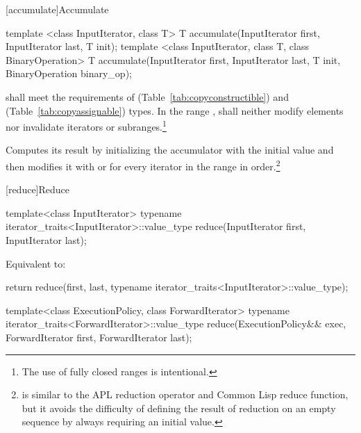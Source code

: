 [accumulate]{Accumulate}

%
\begin{itemdecl}
template <class InputIterator, class T>
  T accumulate(InputIterator first, InputIterator last, T init);
template <class InputIterator, class T, class BinaryOperation>
  T accumulate(InputIterator first, InputIterator last, T init,
               BinaryOperation binary_op);
\end{itemdecl}

\begin{itemdescr}
\pnum
\requires
{} shall meet the requirements of  (Table~\ref{tab:copyconstructible})
and  (Table~\ref{tab:copyassignable}) types.
In the range
,
shall neither modify elements nor invalidate iterators or subranges.\footnote{The use of fully closed ranges is intentional.}

\pnum
\effects
Computes its result by initializing the accumulator
with the initial value
and then modifies it with
or
for every iterator
in the range 
in order.\footnote{
is similar to the APL reduction operator and Common Lisp reduce function, but
it avoids the difficulty of defining the result of reduction on an empty
sequence by always requiring an initial value.}
\end{itemdescr}

[reduce]{Reduce}

%
\begin{itemdecl}
template<class InputIterator>
  typename iterator_traits<InputIterator>::value_type
    reduce(InputIterator first, InputIterator last);
\end{itemdecl}

\begin{itemdescr}
\pnum
\effects Equivalent to:
\begin{codeblock}
return reduce(first, last,
              typename iterator_traits<InputIterator>::value_type{});
\end{codeblock}
\end{itemdescr}

%
\begin{itemdecl}
template<class ExecutionPolicy, class ForwardIterator>
  typename iterator_traits<ForwardIterator>::value_type
    reduce(ExecutionPolicy&& exec,
           ForwardIterator first, ForwardIterator last);
\end{itemdecl}

